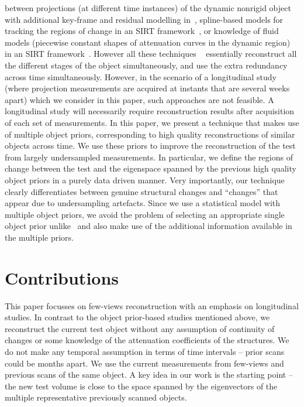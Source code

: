 \documentclass[journal]{IEEEtran}
\begin{document}
between projections (at different time instances) of the dynamic nonrigid object~\cite{koen2020} with additional key-frame and residual modelling in~\cite{Guangming2019}, spline-based models for tracking the regions of change in an SIRT framework~\cite{Van2014}, or knowledge of fluid models (piecewise constant shapes of attenuation curves in the dynamic region) in an SIRT framework~\cite{HaoGao}. However all these techniques ~\cite{daniil2015,koen2020,Van2015,HaoGao,Van2014} essentially reconstruct all the different stages of the object simultaneously, and use the extra redundancy across time simultaneously. However, in the scenario of a longitudinal study (where projection measurements are acquired at instants that are several weeks apart) which we consider in this paper, such approaches are not feasible. A longitudinal study will necessarily require reconstruction results after acquisition of each set of measurements. 
In this paper, we present a technique that makes use of multiple object priors, corresponding to high quality reconstructions of similar objects across time. We use these priors to improve the reconstruction of the test from largely undersampled measurements. In particular, we define the regions of change between the test and the eigenspace spanned by the previous high quality object priors in a purely data driven manner. Very importantly, our technique clearly differentiates between genuine structural changes and ``changes'' that appear due to undersampling artefacts. Since we use a statistical model with multiple object priors, we avoid the problem of selecting an appropriate single object prior unlike~\cite{PICCS,Pourmorteza2015,Lee2012,pirple,Marjolein2016} and also make use of the additional information available in the multiple priors. 

\section{Contributions}
\label{sec:contributions}
This paper focusses on few-views reconstruction with an emphasis on
longitudinal studies. In contrast to
the object prior-based studies mentioned above, we
reconstruct the current test object without any assumption of
continuity of changes or some knowledge of the attenuation
coefficients of the structures. We do not make any temporal assumption
in terms of time intervals -- prior scans could be months apart. We
use the current measurements from few-views and previous scans of the
same object. A key idea in our work is the starting point -- the new
test volume is close to the space spanned by the eigenvectors of the
multiple representative previously scanned objects.
\end{document}
